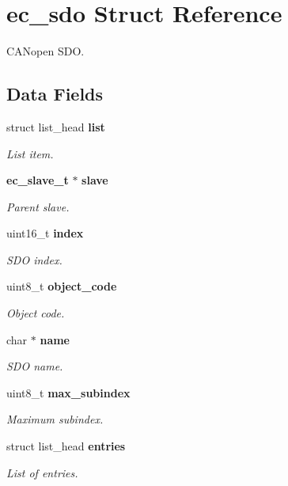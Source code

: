 \section{ec\-\_\-sdo \-Struct \-Reference}
\label{structec__sdo}


\-C\-A\-Nopen \-S\-D\-O.  


\subsection*{\-Data \-Fields}
\begin{DoxyCompactItemize}
\item 
struct list\-\_\-head {\bf list}
\begin{DoxyCompactList}\small\item\em \-List item. \end{DoxyCompactList}\item 
{\bf ec\-\_\-slave\-\_\-t} $\ast$ {\bf slave}
\begin{DoxyCompactList}\small\item\em \-Parent slave. \end{DoxyCompactList}\item 
uint16\-\_\-t {\bf index}
\begin{DoxyCompactList}\small\item\em \-S\-D\-O index. \end{DoxyCompactList}\item 
uint8\-\_\-t {\bf object\-\_\-code}
\begin{DoxyCompactList}\small\item\em \-Object code. \end{DoxyCompactList}\item 
char $\ast$ {\bf name}
\begin{DoxyCompactList}\small\item\em \-S\-D\-O name. \end{DoxyCompactList}\item 
uint8\-\_\-t {\bf max\-\_\-subindex}
\begin{DoxyCompactList}\small\item\em \-Maximum subindex. \end{DoxyCompactList}\item 
struct list\-\_\-head {\bf entries}
\begin{DoxyCompactList}\small\item\em \-List of entries. \end{DoxyCompactList}\end{DoxyCompactItemize}



